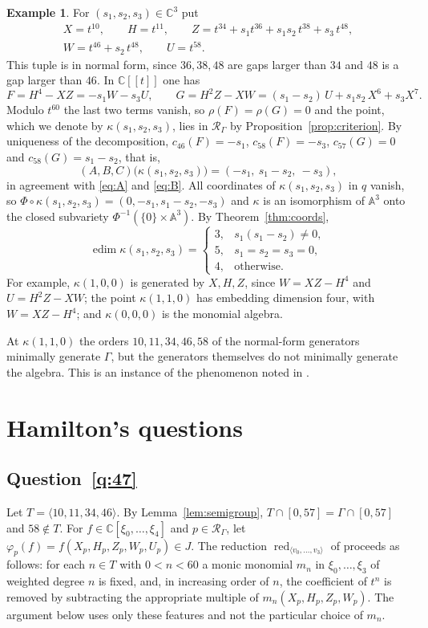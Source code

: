 \documentclass{amsart}
\theoremstyle{definition}
\newtheorem{example}[theorem]{Example}
\theoremstyle{remark}
\numberwithin{equation}{section}
\newcommand{\CC}{\mathbb{C}}
\newcommand{\AF}{\mathbb{A}}
\newcommand{\Rs}{\mathcal{R}_\Gamma}
\newcommand{\ps}{[\![t]\!]}
\DeclareMathOperator{\edim}{edim}
\DeclareMathOperator{\red}{red}
\begin{document}
\begin{example}\label{ex:family}
For $(s_1,s_2,s_3)\in\CC^3$ put
\begin{gather*}
X=t^{10},\qquad H=t^{11},\qquad Z=t^{34}+s_1t^{36}+s_1s_2\,t^{38}+s_3\,t^{48},\\
W=t^{46}+s_2\,t^{48},\qquad U=t^{58}.
\end{gather*}
This tuple is in normal form, since $36,38,48$ are gaps larger than $34$ and $48$ is a gap larger than $46$. In $\CC\ps$ one has
\[
F=H^4-XZ=-s_1W-s_3U,\qquad G=H^2Z-XW=(s_1-s_2)\,U+s_1s_2\,X^6+s_3X^7.
\]
Modulo $t^{60}$ the last two terms vanish, so $\rho(F)=\rho(G)=0$ and the point, which we denote by $\kappa(s_1,s_2,s_3)$, lies in $\Rs$ by Proposition~\ref{prop:criterion}. By uniqueness of the decomposition, $c_{46}(F)=-s_1$, $c_{58}(F)=-s_3$, $c_{57}(G)=0$ and $c_{58}(G)=s_1-s_2$, that is,
\[
(A,B,C)\bigl(\kappa(s_1,s_2,s_3)\bigr)=(-s_1,\ s_1-s_2,\ -s_3),
\]
in agreement with \eqref{eq:A} and \eqref{eq:B}. All coordinates of $\kappa(s_1,s_2,s_3)$ in $q$ vanish, so $\Phi\circ\kappa(s_1,s_2,s_3)=(0,-s_1,s_1-s_2,-s_3)$ and $\kappa$ is an isomorphism of $\AF^3$ onto the closed subvariety $\Phi^{-1}(\{0\}\times\AF^3)$. By Theorem~\ref{thm:coords},
\[
\edim\kappa(s_1,s_2,s_3)=
\begin{cases}
3,& s_1(s_1-s_2)\ne0,\\
5,& s_1=s_2=s_3=0,\\
4,&\text{otherwise.}
\end{cases}
\]
For example, $\kappa(1,0,0)$ is generated by $X,H,Z$, since $W=XZ-H^4$ and $U=H^2Z-XW$; the point $\kappa(1,1,0)$ has embedding dimension four, with $W=XZ-H^4$; and $\kappa(0,0,0)$ is the monomial algebra.
\end{example}

At $\kappa(1,1,0)$ the orders $10,11,34,46,58$ of the normal-form generators minimally generate $\Gamma$, but the generators themselves do not minimally generate the algebra. This is an instance of the phenomenon noted in \cite[Remark~2.5]{Ham20}.

\section{Hamilton's questions}\label{sec:questions}

\subsection{Question~\ref{q:47}}
Let $T=\langle10,11,34,46\rangle$. By Lemma~\ref{lem:semigroup}, $T\cap[0,57]=\Gamma\cap[0,57]$ and $58\notin T$. For $f\in\CC[\xi_0,\dots,\xi_4]$ and $p\in\Rs$, let $\varphi_p(f)=f(X_p,H_p,Z_p,W_p,U_p)\in J$. The reduction $\red_{\langle v_0,\dots,v_3\rangle}$ of \cite[Algorithm~2.15]{Ham20} proceeds as follows: for each $n\in T$ with $0<n<60$ a monic monomial $m_n$ in $\xi_0,\dots,\xi_3$ of weighted degree $n$ is fixed, and, in increasing order of $n$, the coefficient of $t^n$ is removed by subtracting the appropriate multiple of $m_n(X_p,H_p,Z_p,W_p)$. The argument below uses only these features and not the particular choice of $m_n$.
\end{document}
